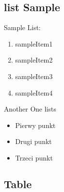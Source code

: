 \subsection{list Sample}
Sample List:
\begin{enumerate}
     \item sampleItem1
      \item sampleItem2
       \item sampleItem3
        \item sampleItem4
        \label{tab:sampleTable}
\end{enumerate}
Another One lists
\begin{itemize}
  \item Pierwy punkt
  \item Drugi punkt
  \item Trzeci punkt
\end{itemize}
\newpage

\subsection{Table}

 

\newpage
